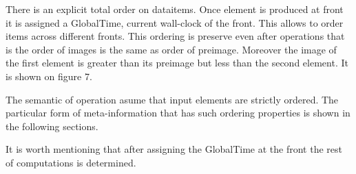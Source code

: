 
\label {fs-timing model}

There is an explicit total order on dataitems. Once element is produced at front it is assigned a GlobalTime, current wall-clock of the front. This allows to order items across different fronts. This ordering is preserve even after operations that is the order of images is the same as order of preimage. Moreover the image of the first element is greater than its preimage but less than the second element. It is shown on figure 7.


The semantic of operation asume that input elements are strictly ordered. The particular form of meta-information that has such ordering properties is shown in the following sections.

It is worth mentioning that after assigning the GlobalTime at the front the rest of computations is determined.
